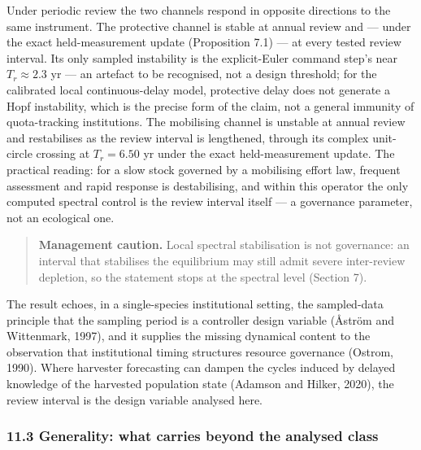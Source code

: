 \documentclass[11pt]{article}
\begin{document}
Under periodic review the two channels respond in opposite directions to
the same instrument. The protective channel is stable at annual review
and --- under the exact held-measurement update (Proposition 7.1) --- at
every tested review interval. Its only sampled instability is the
explicit-Euler command step's near \(T_r \approx 2.3\) yr --- an
artefact to be recognised, not a design threshold; for the calibrated
local continuous-delay model, protective delay does not generate a Hopf
instability, which is the precise form of the claim, not a general
immunity of quota-tracking institutions. The mobilising channel is
unstable at annual review and restabilises as the review interval is
lengthened, through its complex unit-circle crossing at \(T_r = 6.50\)
yr under the exact held-measurement update. The practical reading: for a
slow stock governed by a mobilising effort law, frequent assessment and
rapid response is destabilising, and within this operator the only
computed spectral control is the review interval itself --- a governance
parameter, not an ecological one.

\begin{quote}
\textbf{Management caution.} Local spectral stabilisation is not
governance: an interval that stabilises the equilibrium may still admit
severe inter-review depletion, so the statement stops at the spectral
level (Section 7).
\end{quote}

The result echoes, in a single-species institutional setting, the
sampled-data principle that the sampling period is a controller design
variable (\AA{}str\"om and Wittenmark, 1997), and it supplies the missing
dynamical content to the observation that institutional timing
structures resource governance (Ostrom, 1990). Where harvester
forecasting can dampen the cycles induced by delayed knowledge of the
harvested population state (Adamson and Hilker, 2020), the review
interval is the design variable analysed here.

\subsubsection{11.3 Generality: what carries beyond the analysed
class}\label{generality-what-carries-beyond-the-analysed-class}
\end{document}
